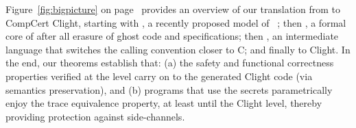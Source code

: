 
Figure~\ref{fig:bigpicture} on page~\pageref{fig:bigpicture} provides
an overview of our translation from \lowstar to CompCert Clight,
%
starting with \emf, a recently proposed model
of \fstar~\cite{dm4free}; then \lamstar, a formal core of \lowstar
after all erasure of ghost code and specifications; then \cstar, an
intermediate language that switches the calling convention closer to
C; and finally to Clight.
%
In the end, our theorems establish that: (a) the safety and functional
correctness properties verified at the \fstar level carry on to the
generated Clight code (via semantics preservation), and (b) \lowstar
programs that use the secrets parametrically enjoy the trace
equivalence property, at least until the Clight level, thereby
providing protection against side-channels.





